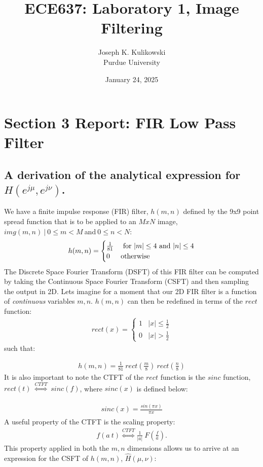 \documentclass{article}
\title{ECE637: Laboratory 1, Image Filtering}
\author{Joseph K. Kulikowski \\
Purdue University}
\date{January 24, 2025}
\begin{document}
\maketitle
\tableofcontents
\listoffigures
\lstlistoflistings
\newpage

\section{Section 3 Report: FIR Low Pass Filter}

\subsection{A derivation of the analytical expression for $H(e^{j \mu}, e^{j \nu})$.}
We have a finite impulse response (FIR) filter, $h(m,n)$ defined by the 9x9 point spread function that is to be applied to an $M x N$ image, $img(m,n) \  |  \ 0 \leq m < M \  $and$ \  0 \leq n < N $:
\begin{align}\label{eq:1}
h(m,n) =
    \begin{cases} 
    \frac{1}{81}& $ for $ |m| \leq 4 $ and $ |n| \leq 4 \\
    0 & $otherwise$
    \end{cases}
\end{align}
The Discrete Space Fourier Transform (DSFT) of this FIR filter can be computed by taking the Continuous Space Fourier Transform (CSFT) and then sampling the output in 2D. Lets imagine for a moment that our 2D FIR filter is a function of \textit{continuous} variables $m, n$. $h(m,n)$ can then be redefined in terms of the $rect$ function:
\begin{align}\label{eq:2}
rect(x) = 
    \begin{cases}
    1 & |x| \leq \frac{1}{2}\\
    0 & |x| > \frac{1}{2}
    \end{cases}
\end{align}
such that:

\begin{align*}
h(m,n) = \frac{1}{81} \ rect(\frac{m}{8})\ rect(\frac{n}{8})
\end{align*}
It is also important to note the CTFT of the $rect$ function is the $sinc$ function, $rect(t) \  \overset{CTFT}{\Longleftrightarrow} \ sinc(f)$, where $sinc(x)$ is defined below:

\begin{align}\label{eq:3}
\begin{split}
sinc(x) = \frac{sin(\pi x)}{\pi x}
\end{split}
\end{align}
A useful property of the CTFT is the scaling property:
\begin{align}\label{eq:4}
f(a \ t)\overset{CTFT}{\Longleftrightarrow}\frac{1}{|a|} \  F(\frac{f}{a}).
\end{align}
This property applied in both the $m,n$ dimensions allows us to arrive at an expression for the CSFT of $h(m, n)$, $\hat{H}(\mu, \nu)$:
\end{document}
